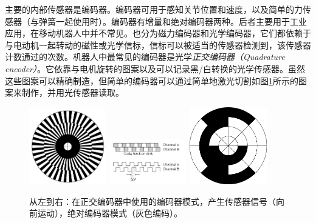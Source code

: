 
主要的内部传感器是编码器。编码器可用于感知关节位置和速度，以及简单的力传感器（与弹簧一起使用时）。编码器有增量和绝对编码器两种。后者主要用于工业应用，在移动机器人中并不常见。也分为磁力编码器和光学编码器，它们都依赖于与电动机一起转动的磁性或光学信标，信标可以被适当的传感器检测到，该传感器计数通过的次数。机器人中最常见的编码器是光学\emph{正交编码器（Quadrature encoder）}。它依靠与电机旋转的图案以及可以记录黑/白转换的光学传感器。虽然这些图案可以精确制造，但简单的编码器可以通过简单地激光切割如图\ref{fig:encoders}所示的图案来制作，并用光传感器读取。

\begin{figure}
	\centering
		\includegraphics[width=0.3\textwidth]{figs/encoderdisk.png}
		\includegraphics[width=0.3\textwidth]{figs/quadraturencoder.png}
		\includegraphics[width=0.3\textwidth]{figs/absoluteencoder.png}
	\caption{从左到右：在正交编码器中使用的编码器模式，产生传感器信号（向前运动），绝对编码器模式（灰色编码）。}
	\label{fig:encoders}
\end{figure}

